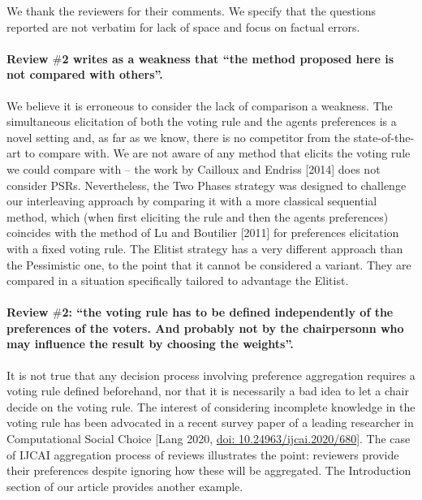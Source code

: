 \documentclass{article}
\newcommand{\commentOC}[1]{\textcolor{blue}{\small$\big[$OC: #1$\big]$}}
\begin{document}
\addtocounter{pagecount}{-4}

	We thank the reviewers for their comments. We specify that the questions reported are not verbatim for lack of space and focus on factual errors. 
\paragraph{Review $\#$2 writes as a weakness that “the method proposed here is not compared with others”.}
We believe it is erroneous to consider the lack of comparison a weakness. The simultaneous elicitation of both the voting rule and the agents preferences is a novel setting and, as far as we know, there is no competitor from the state-of-the-art to compare with. 
We are not aware of any method that elicits the voting rule we could compare with – the work by Cailloux and Endriss [2014] does not consider PSRs. Nevertheless, the Two Phases strategy was designed to challenge our interleaving approach by comparing it with a more classical sequential method, which (when first eliciting the rule and then the agents preferences) coincides with the method of Lu and Boutilier [2011] for preferences elicitation with a fixed voting rule.
The Elitist strategy has a very different approach than the Pessimistic one, to the point that it cannot be considered a variant. They are compared in a situation specifically tailored to advantage the Elitist. 

\paragraph{Review $\#$2: “the voting rule has to be defined independently of the preferences of the voters. And probably not by the chairpersonn who may influence the result by choosing the weights”.}
It is not true that any decision process involving preference aggregation requires a voting rule defined beforehand, nor that it is necessarily a bad idea to let a chair decide on the voting rule. The interest of considering incomplete knowledge in the voting rule has been advocated in a recent survey paper of a leading researcher in Computational Social Choice [Lang 2020, \href{https://doi.org/10.24963/ijcai.2020/680}{doi: 10.24963/ijcai.2020/680}]. The case of IJCAI aggregation process of reviews illustrates the point: reviewers provide their preferences despite ignoring how these will be aggregated. The Introduction section of our article provides another example.
\end{document}
